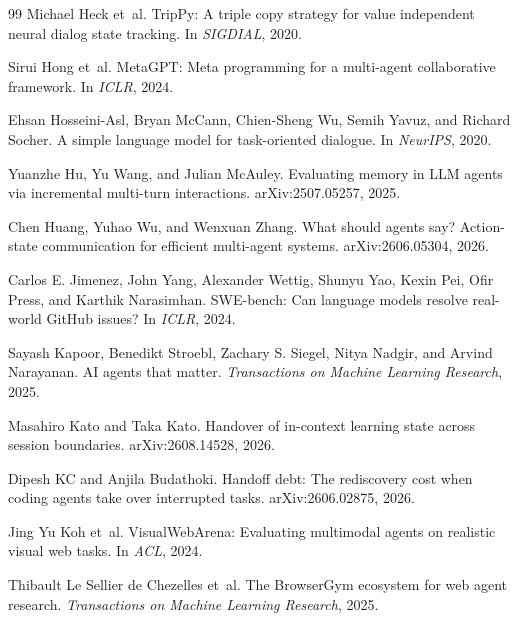 \documentclass[11pt]{article}
\begin{document}
\begin{thebibliography}{99}
Michael Heck et~al.
\newblock TripPy: A triple copy strategy for value independent neural dialog state tracking.
\newblock In \emph{SIGDIAL}, 2020.

Sirui Hong et~al.
\newblock MetaGPT: Meta programming for a multi-agent collaborative framework.
\newblock In \emph{ICLR}, 2024.

Ehsan Hosseini-Asl, Bryan McCann, Chien-Sheng Wu, Semih Yavuz, and Richard Socher.
\newblock A simple language model for task-oriented dialogue.
\newblock In \emph{NeurIPS}, 2020.

Yuanzhe Hu, Yu Wang, and Julian McAuley.
\newblock Evaluating memory in LLM agents via incremental multi-turn interactions.
\newblock arXiv:2507.05257, 2025.

Chen Huang, Yuhao Wu, and Wenxuan Zhang.
\newblock What should agents say? Action-state communication for efficient multi-agent systems.
\newblock arXiv:2606.05304, 2026.

Carlos E. Jimenez, John Yang, Alexander Wettig, Shunyu Yao, Kexin Pei, Ofir Press, and Karthik Narasimhan.
\newblock SWE-bench: Can language models resolve real-world GitHub issues?
\newblock In \emph{ICLR}, 2024.

Sayash Kapoor, Benedikt Stroebl, Zachary S. Siegel, Nitya Nadgir, and Arvind Narayanan.
\newblock AI agents that matter.
\newblock \emph{Transactions on Machine Learning Research}, 2025.

Masahiro Kato and Taka Kato.
\newblock Handover of in-context learning state across session boundaries.
\newblock arXiv:2608.14528, 2026.

Dipesh KC and Anjila Budathoki.
\newblock Handoff debt: The rediscovery cost when coding agents take over interrupted tasks.
\newblock arXiv:2606.02875, 2026.

Jing Yu Koh et~al.
\newblock VisualWebArena: Evaluating multimodal agents on realistic visual web tasks.
\newblock In \emph{ACL}, 2024.

Thibault Le Sellier de Chezelles et~al.
\newblock The BrowserGym ecosystem for web agent research.
\newblock \emph{Transactions on Machine Learning Research}, 2025.


\end{thebibliography}
\end{document}
